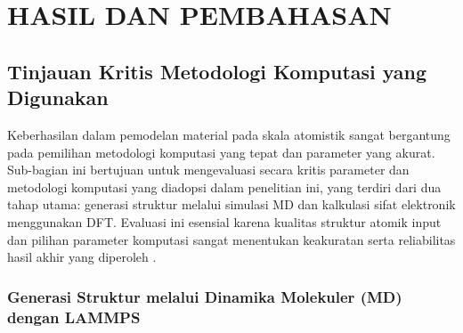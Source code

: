 \renewcommand{\thechapter}{\Roman{chapter}}
\chapter{HASIL DAN PEMBAHASAN}
\renewcommand{\thechapter}{\arabic{chapter}}

\section{Tinjauan Kritis Metodologi Komputasi yang Digunakan}
\label{sec:metodologi_kritis}
Keberhasilan dalam pemodelan material pada skala atomistik sangat bergantung pada pemilihan metodologi komputasi yang tepat dan parameter yang akurat. Sub-bagian ini bertujuan untuk mengevaluasi secara kritis parameter dan metodologi komputasi yang diadopsi dalam penelitian ini, yang terdiri dari dua tahap utama: generasi struktur melalui simulasi MD dan kalkulasi sifat elektronik menggunakan DFT. Evaluasi ini esensial karena kualitas struktur atomik input dan pilihan parameter komputasi sangat menentukan keakuratan serta reliabilitas hasil akhir yang diperoleh . \subsection{Generasi Struktur melalui Dinamika Molekuler (MD) dengan LAMMPS}
\label{subsec:md_lammps}

